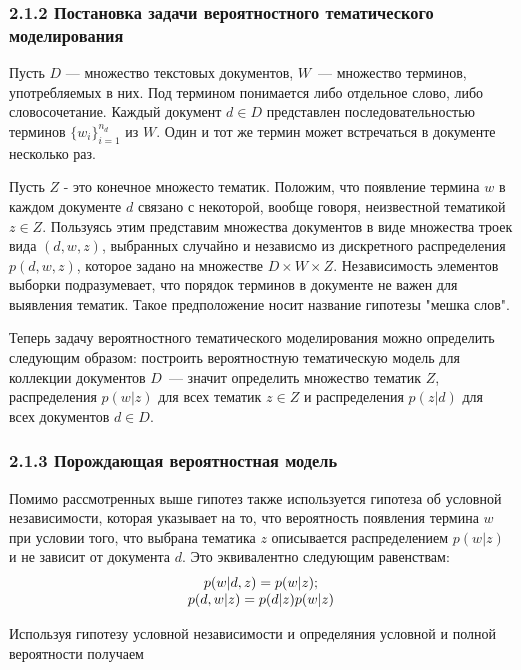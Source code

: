 \documentclass[a4paper]{report}
\begin{document}
	\subsubsection{2.1.2 Постановка задачи вероятностного тематического моделирования}
	
	Пусть $D$ --- множество текстовых документов, $W$~--- множество терминов, употребляемых в них. Под термином понимается либо отдельное слово, либо словосочетание. Каждый документ $d \in D$ представлен последовательностью терминов 
	$ \{w_i\}_{i=1}^{n_d}$ из $W$.
	Один и тот же термин может встречаться в документе несколько раз.
	
	Пусть $Z$ - это конечное множесто тематик. Положим, что появление термина $w$ в каждом документе $d$ связано с некоторой, вообще говоря, неизвестной тематикой $z \in Z$. Пользуясь этим представим множества документов в виде множества троек вида $(d,w,z)$, выбранных случайно и независмо из дискретного распределения $p(d,w,z)$, которое задано на множестве $D \times W \times Z$. Независимость элементов выборки подразумевает, что порядок терминов в документе не важен для выявления тематик. Такое предположение носит название гипотезы "мешка слов".
	
	Теперь задачу вероятностного тематического моделирования можно определить следующим образом: построить вероятностную тематическую модель для коллекции документов $D$~--- значит определить множество тематик $Z$, распределения $p(w|z)$ для всех тематик $z \in Z$ и распределения $p(z|d)$ для всех документов $d \in D$.
	
	\subsubsection{2.1.3 Порождающая вероятностная модель}

	Помимо рассмотренных выше гипотез также используется гипотеза об условной независимости, которая указывает на то, что вероятность появления термина $w$ при	условии того, что выбрана тематика $z$ описывается распределением $p(w|z)$ и не зависит от документа $d$. Это эквивалентно следующим равенствам:
	\begin{equation}
		\begin{array}{c c}
			p(w|d,z) = p(w|z); \\
			p(d,w|z) = p(d|z)p(w|z)
		\end{array}
	\end{equation}

	Используя гипотезу условной независимости и определяния условной и полной вероятности получаем
	
\end{document}
